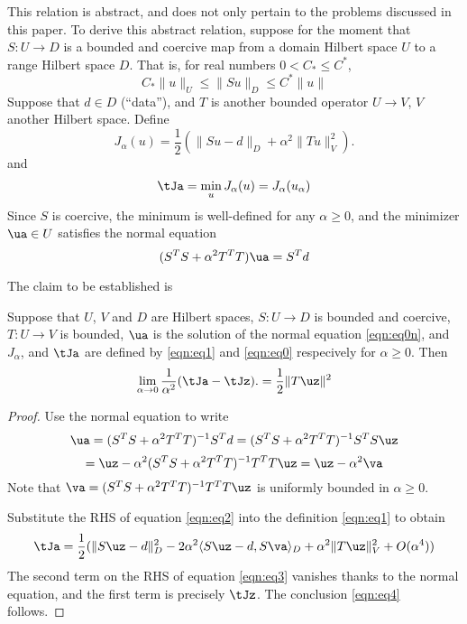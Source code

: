 This relation is abstract, and does not only pertain to the problems
discussed in this paper. To derive this abstract relation, suppose for
the moment that $S:U \rightarrow D$ is a bounded and coercive map from a
domain Hilbert space $U$ to a range Hilbert space $D$. That is, for
real numbers $0 < C_* \le C^*$,
\[
  C_*\|u\|_U \le \|Su\|_D \le C^*\|u\|
\]
Suppose that $d \in D$ (``data''), and $T$ is another bounded operator $U \rightarrow V$, $V$
another Hilbert space. Define
\begin{equation}
  \label{eqn:eq1}
  J_{\alpha}(u) = \frac{1}{2}(\|Su-d\|_D + \alpha^2\|Tu\|_V^2).
\end{equation}
and
\begin{equation}
  \label{eqn:eq0}
  \tJa= \min_u J_{\alpha}(u) = J_{\alpha}(u_{\alpha})
\end{equation}
Since $S$ is coercive, the minimum is well-defined for any
$\alpha \ge 0$, and the minimizer $\ua \in U$ satisfies the normal
equation
\begin{equation}
  \label{eqn:eq0n}
  (S^TS + \alpha^2 T^TT) \ua = S^Td
\end{equation}

The claim to be established is
\begin{prop}
  \label{thm:alphalim}
  Suppose that $U$, $V$ and $D$ are Hilbert spaces,
  $S:U\rightarrow D$ is bounded and coercive, $T:U\rightarrow V$ is
  bounded, $\ua$ is the solution of
  the normal equation \ref{eqn:eq0n}, and $J_{\alpha}$,
  and $\tJa$ are defined by \ref{eqn:eq1} and \ref{eqn:eq0}
  respecively for $\alpha \ge 0$. Then
\begin{equation}
  \label{eqn:eq4}
  \lim_{\alpha \rightarrow 0} \frac{1}{\alpha^2}  (\tJa-\tJz).= \frac{1}{2}\|T\uz\|^2
\end{equation}
\end{prop}

\begin{proof}
Use the normal equation to write
\[
  \ua = (S^TS + \alpha^2 T^TT)^{-1}S^Td = (S^TS + \alpha^2 T^TT)^{-1}S^TS \uz
\]
\begin{equation}
  \label{eqn:eq2}
  = \uz - \alpha^2 (S^TS + \alpha^2 T^TT)^{-1}T^TT\uz = \uz-\alpha^2 \va
\end{equation}
Note that $\va = (S^TS + \alpha^2 T^TT)^{-1}T^TT\uz$ is uniformly bounded in $\alpha \ge 0$.

Substitute the RHS of equation \ref{eqn:eq2} into the definition \ref{eqn:eq1} to obtain
\begin{equation}
  \label{eqn:eq3}
  \tJa = \frac{1}{2}(\|S\uz-d\|_D^2 - 2 \alpha^2\langle S\uz-d, S\va\rangle_D + \alpha^2\|T\uz\|_V^2 + O(\alpha^4))
\end{equation}
The second term on the RHS of equation \ref{eqn:eq3} vanishes thanks to the normal equation, and the first term is precisely $\tJz$. The conclusion \ref{eqn:eq4} follows.
\end{proof}

